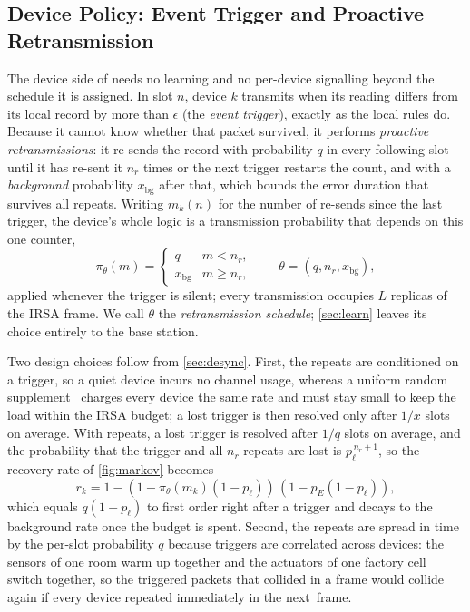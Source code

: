 \documentclass[conference]{IEEEtran}
\begin{document}
\subsection{Device Policy: Event Trigger and Proactive Retransmission}
\label{sec:device}
  The device side of \tool needs no learning and no per-device signalling beyond the schedule it is assigned.
  In slot $n$, device $k$ transmits when its reading differs from its local record by more than $\epsilon$ (the \emph{event trigger}), exactly as the local rules do.
  Because it cannot know whether that packet survived, it performs \emph{proactive retransmissions}: it re-sends the record with probability $q$ in every following slot until it has re-sent it $n_r$ times or the next trigger restarts the count, and with a \emph{background} probability $x_{\mathrm{bg}}$ after that, which bounds the error duration that survives all repeats.
  Writing $m_k(n)$ for the number of re-sends since the last trigger, the device's whole logic is a transmission probability that depends on this one counter,
  \begin{equation}
    \pi_\theta(m) = \begin{cases} q & m < n_r, \\ x_{\mathrm{bg}} & m \ge n_r, \end{cases}
    \qquad \theta = (q, n_r, x_{\mathrm{bg}}),
    \label{eq:schedule}
  \end{equation}
  applied whenever the trigger is silent; every transmission occupies $L$ replicas of the IRSA frame.
  We call $\theta$ the \emph{retransmission schedule}; \autoref{sec:learn} leaves its choice entirely to the base station.

  Two design choices follow from \autoref{sec:desync}.
  First, the repeats are conditioned on a trigger, so a quiet device incurs no channel usage, whereas a uniform random supplement~\cite{munari2024monitoring} charges every device the same rate and must stay small to keep the load within the IRSA budget; a lost trigger is then resolved only after $1/x$ slots on average.
  With repeats, a lost trigger is resolved after $1/q$ slots on average, and the probability that the trigger and all $n_r$ repeats are lost is $p_\ell^{\,n_r+1}$, so the recovery rate of \autoref{fig:markov} becomes
  \begin{equation}
    r_k = 1 - (1 - \pi_\theta(m_k) (1 - p_\ell))\,(1 - p_E (1 - p_\ell)),
    \label{eq:repair}
  \end{equation}
  which equals $q(1-p_\ell)$ to first order right after a trigger and decays to the background rate once the budget is spent.
  Second, the repeats are spread in time by the per-slot probability $q$ because triggers are correlated across devices: the sensors of one room warm up together and the actuators of one factory cell switch together, so the triggered packets that collided in a frame would collide again if every device repeated immediately in the next~frame.
\end{document}
